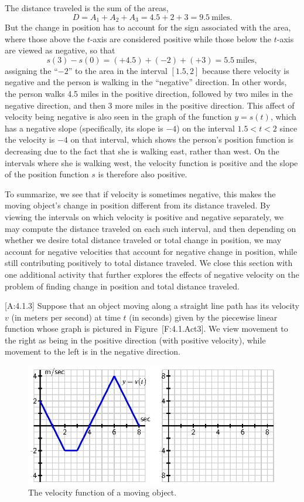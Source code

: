 The distance traveled is the sum of the areas,
\[D = A_1 + A_2 + A_3 = 4.5 + 2 + 3 = 9.5 \ \mbox{miles}.\] But the
change in position has to account for the sign associated with the area,
where those above the \(t\)-axis are considered positive while those
below the \(t\)-axis are viewed as negative, so that
\[s(3) - s(0) = (+4.5) + (-2) + (+3) = 5.5 \ \mbox{miles},\] assigning
the ``\(-2\)'' to the area in the interval \([1.5,2]\) because there
velocity is negative and the person is walking in the ``negative''
direction. In other words, the person walks 4.5 miles in the positive
direction, followed by two miles in the negative direction, and then 3
more miles in the positive direction. This affect of velocity being
negative is also seen in the graph of the function \(y=s(t)\), which has
a negative slope (specifically, its slope is \(-4\)) on the interval
\(1.5<t<2\) since the velocity is \(-4\) on that interval, which shows
the person's position function is decreasing due to the fact that she is
walking east, rather than west. On the intervals where she is walking
west, the velocity function is positive and the slope of the position
function \(s\) is therefore also positive.

To summarize, we see that if velocity is sometimes negative, this makes
the moving object's change in position different from its distance
traveled. By viewing the intervals on which velocity is positive and
negative separately, we may compute the distance traveled on each such
interval, and then depending on whether we desire total distance
traveled or total change in position, we may account for negative
velocities that account for negative change in position, while still
contributing positively to total distance traveled. We close this
section with one additional activity that further explores the effects
of negative velocity on the problem of finding change in position and
total distance traveled.

{[}A:4.1.3{]} Suppose that an object moving along a straight line path
has its velocity \(v\) (in meters per second) at time \(t\) (in seconds)
given by the piecewise linear function whose graph is pictured in
Figure~{[}F:4.1.Act3{]}. We view movement to the right as being in the
positive direction (with positive velocity), while movement to the left
is in the negative direction.

\begin{figure}[htbp]
\centering
\includegraphics{figures/4_1_Act3.eps}
\caption{The velocity function of a moving object.{}}
\end{figure}


